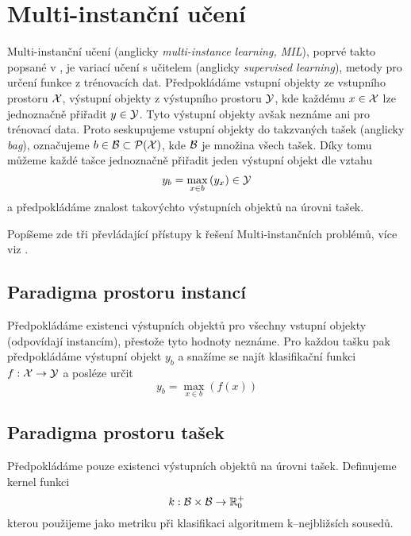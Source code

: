 \chapter{Multi-instanční učení}
Multi-instanční učení (anglicky \textenglish{\textit{multi-instance learning, MIL}}), poprvé takto popsané v \cite{dietterich_solving_1997}, je variací učení s učitelem (anglicky \textenglish{\textit{supervised learning}}), metody pro určení funkce z trénovacích dat. Předpokládáme vstupní objekty ze vstupního prostoru \( \mathcal X \), výstupní objekty z výstupního prostoru \( \mathcal Y \), kde každému \( x \in \mathcal X \) lze jednoznačně přiřadit \( y \in \mathcal Y \). Tyto výstupní objekty avšak neznáme ani pro trénovací data. Proto seskupujeme vstupní objekty do takzvaných tašek (anglicky \textenglish{\textit{bag}}), označujeme \( b \in \mathcal B \subset \mathcal P ( \mathcal X ) \), kde \( \mathcal B \) je množina všech tašek. Díky tomu můžeme každé tašce jednoznačně přiřadit jeden výstupní objekt dle vztahu
\begin{equation}\label{baglabel}
	y_b = \max_{x \in b} \left( y_x \right) \in \mathcal Y
\end{equation}
a předpokládáme znalost takovýchto výstupních objektů na úrovni tašek. 

Popíšeme zde tři převládající přístupy k řešení Multi-instančních problémů, více viz \cite{pevny_using_2016}.

\section{Paradigma prostoru instancí}
Předpokládáme existenci výstupních objektů pro všechny vstupní objekty (odpovídají instancím), přestože tyto hodnoty neznáme. Pro každou tašku pak předpokládáme výstupní objekt \( y_b \) a snažíme se najít klasifikační funkci \( f : \mathcal X \to \mathcal Y \) a posléze určit
\begin{equation}
	y_b = \max_{x \in b} \left( f \left( x \right) \right)
\end{equation}

\section{Paradigma prostoru tašek}
Předpokládáme pouze existenci výstupních objektů na úrovni tašek. Definujeme kernel funkci
\begin{equation}
	k : \mathcal B \times \mathcal B \to \mathbb R_0^+
\end{equation}
kterou použijeme jako metriku při klasifikaci algoritmem k--nejbližsích sousedů.

